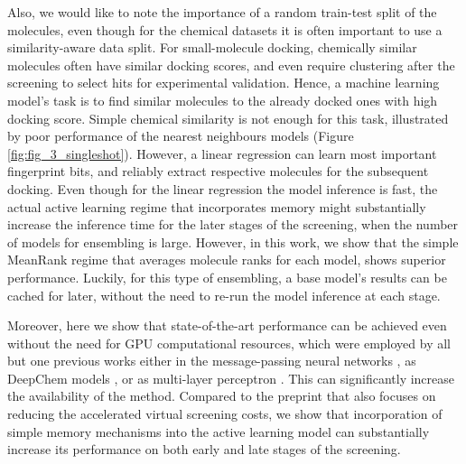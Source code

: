 Also, we would like to note the importance of a random train-test split of the molecules, even though for the chemical datasets it is often important to use a similarity-aware data split. For small-molecule docking, chemically similar molecules often have similar docking scores, and even require clustering after the screening to select hits for experimental validation. Hence, a machine learning model's task is to find similar molecules to the already docked ones with high docking score. Simple chemical similarity is not enough for this task, illustrated by poor performance of the nearest neighbours models (Figure \ref{fig:fig_3_singleshot}). However, a linear regression can learn most important fingerprint bits, and reliably extract respective molecules for the subsequent docking. 
Even though for the linear regression the model inference is fast, the actual active learning regime that incorporates memory might substantially increase the inference time for the later stages of the screening, when the number of models for ensembling is large. However, in this work, we show that the simple MeanRank regime that averages molecule ranks for each model, shows superior performance. Luckily, for this type of ensembling, a base model's results can be cached for later, without the need to re-run the model inference at each stage.

Moreover, here we show that state-of-the-art performance can be achieved even without the need for GPU computational resources, which were employed by all but one previous works either in the message-passing neural networks \cite{Graff2021AcceleratingLearning}, as DeepChem models \cite{Yang2021_shoichet_active_learning}, or as multi-layer perceptron \cite{deepdocking}. This can significantly increase the availability of the method. Compared to the preprint \cite{logistic_regression} that also focuses on reducing the accelerated virtual screening costs, we show that incorporation of simple memory mechanisms into the active learning model can substantially increase its performance on both early and late stages of the screening.
